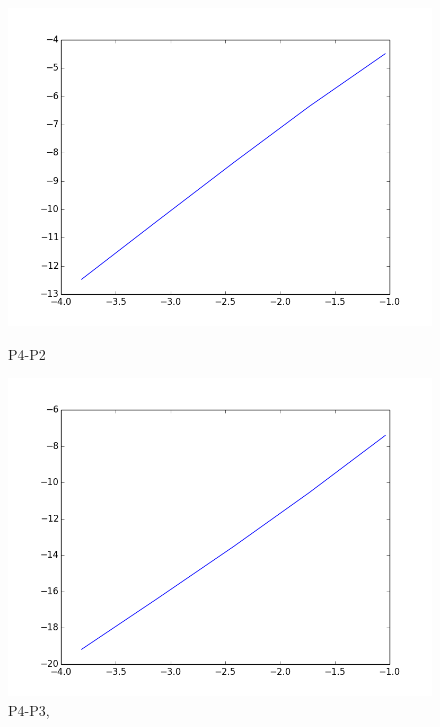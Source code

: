 \documentclass[a4paper,norsk]{article}
\begin{document}
\begin{figure}[h]
\begin{minipage}[b]{0.5\linewidth}
    \includegraphics[scale=0.3]{log_plot_p4_p2.png}    
    \caption{P4-P2} 
    \vspace{4ex}
  \end{minipage}%
  \begin{minipage}[b]{0.5\linewidth}
    \centering
    \includegraphics[scale=0.3]{log_plot_p4_p3.png}    
    \caption{P4-P3, } 
    \vspace{4ex}
  \end{minipage} 
\end{figure}
\newpage
\end{document}
